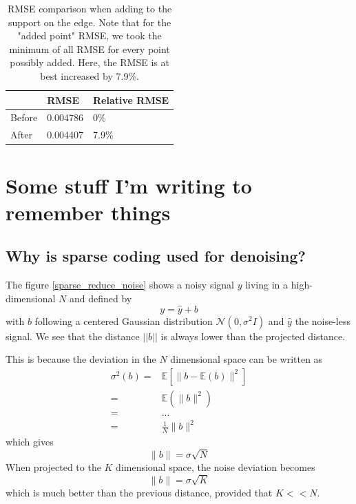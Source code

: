 \begin{table}[!h]\centering
\begin{tabular}{@{}lll@{}}\toprule
 & RMSE & Relative RMSE \\ \midrule
Before & 0.004786 & 0\% \\
After & 0.004407 & 7.9\% \\ \bottomrule
\end{tabular}
\caption{RMSE comparison when adding to the support on the  edge. Note that for the "added point" RMSE, we took the minimum of all RMSE for every point possibly added. Here, the RMSE is at best increased by 7.9\%.}
\end{table}



\clearpage
{}
\appendix

\chapter{Some stuff I'm writing to remember things}

\section{Why is sparse coding used for denoising?}

The figure \ref{sparse_reduce_noise} shows a noisy signal $y$ living in a high-dimensional $N$ and defined by
$$y=\hat{y} + b$$
with $b$ following a centered Gaussian distribution $\mathcal{N}(0,\sigma^2I)$ and $\hat{y}$ the noise-less signal. We see that the distance $||b||$ is always lower than the projected distance.

This is because the deviation in the $N$ dimensional space can be written as
\begin{align*}
\sigma^2(b) =& \mathbb{E}\left[\lVert b-\mathbb{E}(b) \rVert^2 \right]\\
=& \mathbb{E}\left(\lVert b \rVert^2 \right)\\
=& ... \\ %
=& \frac{1}{N}\lVert b \rVert^2
\end{align*}
which gives 
$$ \lVert b \rVert = \sigma\sqrt{N} $$
When projected to the $K$ dimensional space, the noise deviation becomes
$$\lVert b \rVert = \sigma\sqrt{K} $$
which is much better than the previous distance, provided that $K<<N$. 

